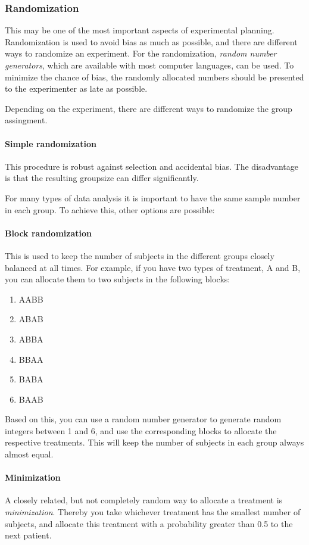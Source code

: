 \subsubsection{Randomization} 
This may be one of the most important aspects of experimental planning. Randomization is used to avoid bias as much as possible, and there are different ways to randomize an experiment. For the randomization, \emph{random number generators}, which are available with most computer languages, can be used. To minimize the chance of bias, the randomly allocated numbers should be presented to the experimenter as late as possible.

Depending on the experiment, there are different ways to randomize the group assingment.

\paragraph{Simple randomization}
This procedure is robust against selection and accidental bias. The disadvantage is that the resulting groupsize can differ significantly.

For many types of data analysis it is important to have the same sample number in each group. To achieve this, other options are possible:

\paragraph{Block randomization}
This is used to keep the number of subjects in the different groups closely balanced at all times. For example, if you have two types of treatment, A and B, you can allocate them to two subjects in the following blocks:

\begin{enumerate}
  \item AABB
  \item ABAB
  \item ABBA
  \item BBAA
  \item BABA
  \item BAAB
\end{enumerate}

Based on this, you can use a random number generator to generate random integers between 1 and 6, and use the corresponding blocks to allocate the respective treatments. This will keep the number of subjects in each group always almost equal.

\paragraph{Minimization}
A closely related, but not completely random way to allocate a treatment is \emph{minimization}. Thereby you take whichever treatment has the smallest number of subjects, and allocate this treatment with a probability greater than 0.5 to the next patient.

